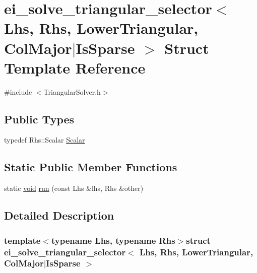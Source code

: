 \hypertarget{structei__solve__triangular__selector_3_01_lhs_00_01_rhs_00_01_lower_triangular_00_01_col_major_7_is_sparse_01_4}{\section{ei\-\_\-solve\-\_\-triangular\-\_\-selector$<$ Lhs, Rhs, Lower\-Triangular, Col\-Major$|$\-Is\-Sparse $>$ Struct Template Reference}
\label{structei__solve__triangular__selector_3_01_lhs_00_01_rhs_00_01_lower_triangular_00_01_col_major_7_is_sparse_01_4}
}


{\ttfamily \#include $<$Triangular\-Solver.\-h$>$}

\subsection*{Public Types}
\begin{DoxyCompactItemize}
\item 
typedef Rhs\-::\-Scalar \hyperlink{structei__solve__triangular__selector_3_01_lhs_00_01_rhs_00_01_lower_triangular_00_01_col_major_7_is_sparse_01_4_a05f3b1dcbf9ef46e965a7b8bebd0cb12}{Scalar}
\end{DoxyCompactItemize}
\subsection*{Static Public Member Functions}
\begin{DoxyCompactItemize}
\item 
static \hyperlink{group___u_a_v_objects_plugin_ga444cf2ff3f0ecbe028adce838d373f5c}{void} \hyperlink{structei__solve__triangular__selector_3_01_lhs_00_01_rhs_00_01_lower_triangular_00_01_col_major_7_is_sparse_01_4_a69e77e54d7d950d87fc18aafe0e88eb2}{run} (const Lhs \&lhs, Rhs \&other)
\end{DoxyCompactItemize}


\subsection{Detailed Description}
\subsubsection*{template$<$typename Lhs, typename Rhs$>$struct ei\-\_\-solve\-\_\-triangular\-\_\-selector$<$ Lhs, Rhs, Lower\-Triangular, Col\-Major$|$\-Is\-Sparse $>$}



